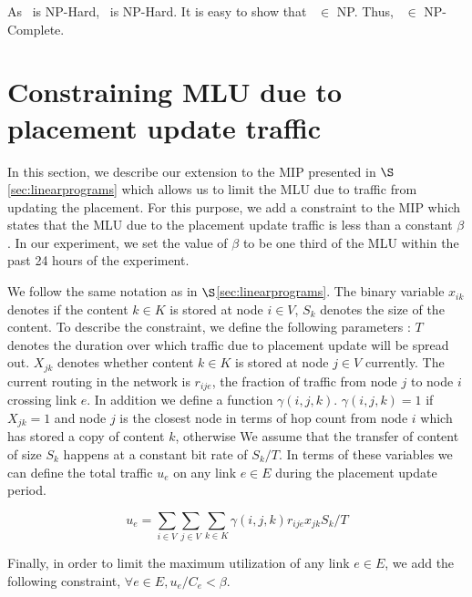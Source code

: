 {As \subsetsum\ is NP-Hard, \optloc\ is NP-Hard. It is easy to show that \optloc\ $\in$ NP. Thus, \optloc\ $\in$ NP-Complete.


\section{Constraining MLU due to  placement update traffic}

In this section, we describe our extension to the MIP presented in $\S$\ref{sec:linearprograms} which allows us to limit the MLU due to traffic from updating the placement. For this purpose, we add a constraint to the MIP which states that the MLU due to the placement update traffic is less than a constant $\beta$. In our experiment, we set the value of $\beta$ to be one third of the MLU within the past 24 hours of the experiment. 

We follow the same notation as in $\S$\ref{sec:linearprograms}. The binary variable $x_{ik}$ denotes if the content $k \in K$ is stored at node $i \in V$, $S_k$  denotes the size of the content.  
To describe the constraint, we  define the following parameters :  $T$ denotes the duration over which traffic due to placement update will be spread out.   $X_{jk}$ denotes whether content $k \in K$ is stored at node $j \in V$ currently. The current routing in the network is $r_{ije}$,  the fraction of traffic  from node $j$ to node $i$ crossing link $e$.  In addition we define a function  $\gamma(i, j, k)$.  $\gamma(i, j, k) = 1$  if $X_{jk} = 1$ and node $j$ is the closest node in terms of hop count from node $i$ which has stored a copy of content $k$, otherwise  We assume that the transfer of content of size $S_k$ happens at a constant bit rate of $S_k/T$. In terms of these variables we can define the total traffic  $u_e $ on any link $e \in E$ during the placement update period. 

\[u_e = \sum_{i \in V}  \sum_{j \in V}  \sum_{k \in K}  \gamma(i, j, k) r_{ije}  x_{jk} S_k / T \]

Finally, in order to limit the maximum utilization of any link $e \in E$, we add the following constraint, $\forall e \in E, u_e /C_e < \beta$.



}


